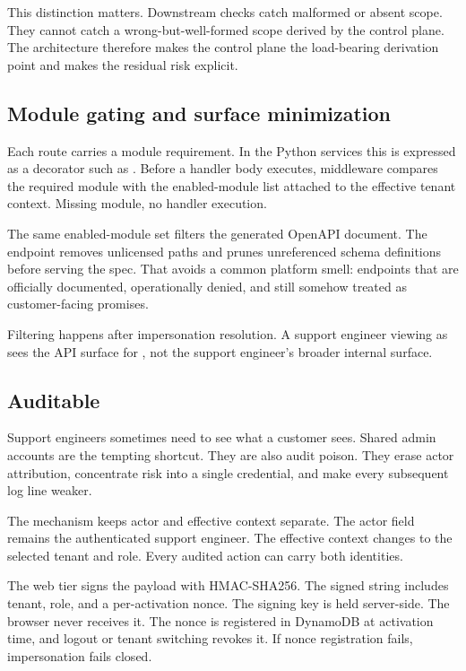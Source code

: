 This distinction matters. Downstream checks catch malformed or absent scope. They cannot catch a wrong-but-well-formed scope derived by the control plane. The architecture therefore makes the control plane the load-bearing derivation point and makes the residual risk explicit.

\subsection{Module gating and surface minimization}

Each route carries a module requirement. In the Python services this is expressed as a decorator such as . Before a handler body executes, middleware compares the required module with the enabled-module list attached to the effective tenant context. Missing module, no handler execution.

The same enabled-module set filters the generated OpenAPI document. The  endpoint removes unlicensed paths and prunes unreferenced schema definitions before serving the spec. That avoids a common platform smell: endpoints that are officially documented, operationally denied, and still somehow treated as customer-facing promises.

Filtering happens after impersonation resolution. A support engineer viewing as  sees the API surface for , not the support engineer's broader internal surface.

\subsection{Auditable \viewas{}}

Support engineers sometimes need to see what a customer sees. Shared admin accounts are the tempting shortcut. They are also audit poison. They erase actor attribution, concentrate risk into a single credential, and make every subsequent log line weaker.

The \viewas{} mechanism keeps actor and effective context separate. The actor field remains the authenticated support engineer. The effective context changes to the selected tenant and role. Every audited action can carry both identities.

The web tier signs the  payload with HMAC-SHA256. The signed string includes tenant, role, and a per-activation nonce. The signing key is held server-side. The browser never receives it. The nonce is registered in DynamoDB at activation time, and logout or tenant switching revokes it. If nonce registration fails, impersonation fails closed.

